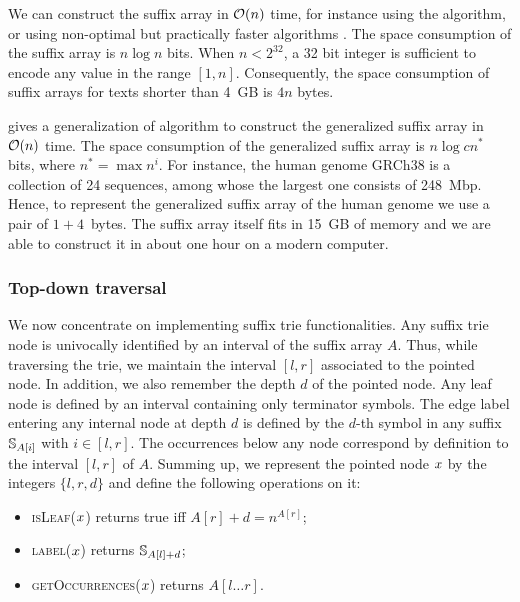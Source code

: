 We can construct the suffix array in $\mathcal{O}(n)$ time, for instance using the \citep{Karkkainen2003} algorithm, or using non-optimal but practically faster algorithms \citep{?}.
The space consumption of the suffix array is $n \log{n}$ bits.
When $n < 2^{32}$, a 32 bit integer is sufficient to encode any value in the range $[1,n]$.
Consequently, the space consumption of suffix arrays for texts shorter than 4~GB is $4 n$ bytes.

\citep{Weese2013} gives a generalization of \citeauthor{Karkkainen2003} algorithm to construct the generalized suffix array in $\mathcal{O}(n)$ time.
The space consumption of the generalized suffix array is $n \log{cn^*}$ bits, where $n^* = \max{n^i}$.
For instance, the human genome GRCh38 is a collection of 24 sequences, among whose the largest one consists of 248~Mbp.
Hence, to represent the generalized suffix array of the human genome we use a pair of $1+4$~bytes.
The suffix array itself fits in 15~GB of memory and we are able to construct it in about one hour on a modern computer.

\subsubsection{Top-down traversal}

We now concentrate on implementing suffix trie functionalities.
Any suffix trie node is univocally identified by an interval of the suffix array $A$.
Thus, while traversing the trie, we maintain the interval $[l,r]$ associated to the pointed node.
In addition, we also remember the depth $d$ of the pointed node.
Any leaf node is defined by an interval containing only terminator symbols.
The edge label entering any internal node at depth $d$ is defined by the $d$-th symbol in any suffix $\mathbb {S}_{A[i]}$ with $i \in [l,r]$.
The occurrences below any node correspond by definition to the interval $[l,r]$ of $A$.
Summing up, we represent the pointed node $x$ by the integers $\{ l, r ,d \}$ and define the following operations on it:
\begin{itemize}
\item \textsc{isLeaf}($x$) returns true iff $A[r] + d = n^{A[r]}$;
\item \textsc{label}($x$) returns $\mathbb {S}_{A[l] + d}$;
\item \textsc{getOccurrences}($x$) returns $A[l \dots r]$.
\end{itemize}

